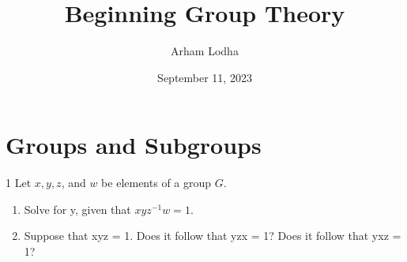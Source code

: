 \documentclass{article}
\begin{document}
\title{Beginning Group Theory}
\author{Arham Lodha}%
\date{September 11, 2023}%
\maketitle

\section*{Groups and Subgroups}
\begin{PROB}{1}\label{Problem 1.}
    Let $x, y, z$, and $w$ be elements of a group $G$.

    \begin{enumerate}{}
        \item Solve for y, given that $xyz^{-1}w = 1$.
        \item Suppose that xyz = 1. Does it follow that yzx = 1? Does it follow that yxz = 1?
    \end{enumerate}
\end{PROB}
\end{document}
